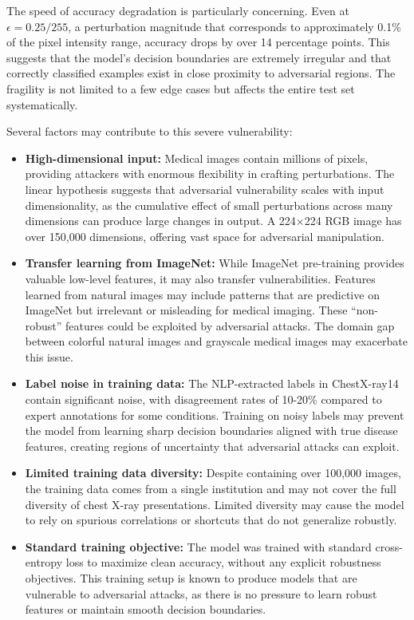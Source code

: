 \documentclass[12pt,a4paper]{article}
\begin{document}
The speed of accuracy degradation is particularly concerning. Even at $\epsilon=0.25/255$, a perturbation magnitude that corresponds to approximately 0.1\% of the pixel intensity range, accuracy drops by over 14 percentage points. This suggests that the model's decision boundaries are extremely irregular and that correctly classified examples exist in close proximity to adversarial regions. The fragility is not limited to a few edge cases but affects the entire test set systematically.

Several factors may contribute to this severe vulnerability:

\begin{itemize}[leftmargin=*]
    \item \textbf{High-dimensional input:} Medical images contain millions of pixels, providing attackers with enormous flexibility in crafting perturbations. The linear hypothesis suggests that adversarial vulnerability scales with input dimensionality, as the cumulative effect of small perturbations across many dimensions can produce large changes in output. A 224$\times$224 RGB image has over 150,000 dimensions, offering vast space for adversarial manipulation.
    
    \item \textbf{Transfer learning from ImageNet:} While ImageNet pre-training provides valuable low-level features, it may also transfer vulnerabilities. Features learned from natural images may include patterns that are predictive on ImageNet but irrelevant or misleading for medical imaging. These ``non-robust'' features could be exploited by adversarial attacks. The domain gap between colorful natural images and grayscale medical images may exacerbate this issue.
    
    \item \textbf{Label noise in training data:} The NLP-extracted labels in ChestX-ray14 contain significant noise, with disagreement rates of 10-20\% compared to expert annotations for some conditions. Training on noisy labels may prevent the model from learning sharp decision boundaries aligned with true disease features, creating regions of uncertainty that adversarial attacks can exploit.
    
    \item \textbf{Limited training data diversity:} Despite containing over 100,000 images, the training data comes from a single institution and may not cover the full diversity of chest X-ray presentations. Limited diversity may cause the model to rely on spurious correlations or shortcuts that do not generalize robustly.
    
    \item \textbf{Standard training objective:} The model was trained with standard cross-entropy loss to maximize clean accuracy, without any explicit robustness objectives. This training setup is known to produce models that are vulnerable to adversarial attacks, as there is no pressure to learn robust features or maintain smooth decision boundaries.
\end{itemize}
\end{document}
